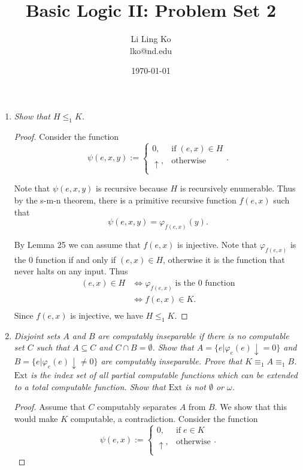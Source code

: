 \documentclass{article}
\begin{document}
\title{Basic Logic II: Problem Set 2}
\author{Li Ling Ko\\ lko@nd.edu}
\date{\today}
\maketitle

\begin{enumerate}[label={\bf Q\arabic*:}]
  \item \it Show that $H\leq_1K$.
    \begin{proof}
      Consider the function
      \begin{equation*}
        \psi(e,x,y) :=
        \begin{cases}
          0, &\text{if}\; (e,x)\in H\\
          \uparrow, &\text{otherwise}\\
        \end{cases}.
      \end{equation*}

      Note that $\psi(e,x,y)$ is recursive because $H$ is recursively
      enumerable. Thus by the s-m-n theorem, there is a primitive
      recursive function $f(e,x)$ such that
      \[\psi(e,x,y)=\varphi_{f(e,x)}(y).\]

      By Lemma 25 we can assume that $f(e,x)$ is injective. Note that
      $\varphi_{f(e,x)}$ is the 0 function if and only if $(e,x)\in H$,
      otherwise it is the function that never halts on any input. Thus
      \begin{align*}
        (e,x)\in H &\Leftrightarrow \varphi_{f(e,x)}\; \text{is the 0
          function}\\
        &\Leftrightarrow f(e,x)\in K.\\
      \end{align*}
      Since $f(e,x)$ is injective, we have $H\leq_1K$.
    \end{proof}

  \item \it Disjoint sets $A$ and $B$ are computably inseparable if there
    is no computable set $C$ such that $A\subseteq C$ and $C\cap
    B=\emptyset$. Show that $A=\{e|\varphi_e(e)\downarrow=0\}$ and
    $B=\{e|\varphi_e(e)\downarrow\neq0\}$ are computably inseparable. Prove
    that $K\equiv_1A\equiv_1B$. $\text{Ext}$ is the index set of all
    partial computable functions which can be extended to a total
    computable function. Show that $\text{Ext}$ is not $\emptyset$ or
    $\omega$.

    \begin{proof}
      Assume that $C$ computably separates $A$ from $B$. We show that this
      would make $K$ computable, a contradiction. Consider the function
      \begin{equation*}
        \psi(e,x) :=
        \begin{cases}
          0, &\text{if}\; e\in K\\
          \uparrow, &\text{otherwise}\\
        \end{cases}.
      \end{equation*}


\end{proof}
\end{enumerate}
\end{document}
